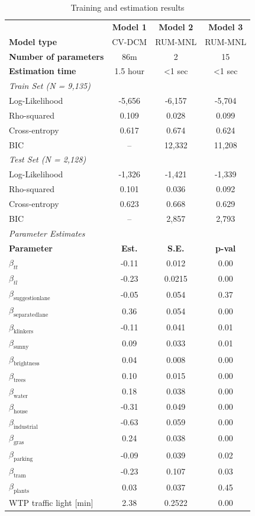 \begin{table}[htbp]
    \centering
    \caption{Training and estimation results}
    \begin{tabular}{lccc}
    \hline
     & \textbf{Model 1} & \textbf{Model 2} & \textbf{Model 3} \\
    \textbf{Model type} & CV-DCM & RUM-MNL & RUM-MNL \\
    \textbf{Number of parameters} & 86m & 2 & 15 \\
    \textbf{Estimation time} & 1.5 hour & <1 sec & <1 sec \\
    \hline
    \multicolumn{4}{l}{\textit{Train Set (N = 9,135)}} \\
    Log-Likelihood & -5,656 & -6,157 & -5,704 \\
    Rho-squared & 0.109 & 0.028 & 0.099 \\
    Cross-entropy & 0.617 & 0.674 & 0.624 \\
    BIC & -- & 12,332 & 11,208 \\
    \hline
    \multicolumn{4}{l}{\textit{Test Set (N = 2,128)}} \\
    Log-Likelihood & -1,326 & -1,421 & -1,339 \\
    Rho-squared & 0.101 & 0.036 & 0.092 \\
    Cross-entropy & 0.623 & 0.668 & 0.629 \\
    BIC & -- & 2,857 & 2,793 \\
    \hline
    \multicolumn{4}{l}{\textit{Parameter Estimates}} \\
    \textbf{Parameter} & \textbf{Est.} & \textbf{S.E.} & \textbf{p-val} \\
    $\beta_{tt}$ & -0.11 & 0.012 & 0.00 \\
    $\beta_{tl}$ & -0.23 & 0.0215 & 0.00 \\
    $\beta_{\text{suggestionlane}}$ & -0.05 & 0.054 & 0.37 \\
    $\beta_{\text{separatedlane}}$ & 0.36 & 0.054 & 0.00 \\
    $\beta_{\text{klinkers}}$ & -0.11 & 0.041 & 0.01 \\
    $\beta_{\text{sunny}}$ & 0.09 & 0.033 & 0.01 \\
    $\beta_{\text{brightness}}$ & 0.04 & 0.008 & 0.00 \\
    $\beta_{\text{trees}}$ & 0.10 & 0.015 & 0.00 \\
    $\beta_{\text{water}}$ & 0.18 & 0.038 & 0.00 \\
    $\beta_{\text{house}}$ & -0.31 & 0.049 & 0.00 \\
    $\beta_{\text{industrial}}$ & -0.63 & 0.059 & 0.00 \\
    $\beta_{\text{gras}}$ & 0.24 & 0.038 & 0.00 \\
    $\beta_{\text{parking}}$ & -0.09 & 0.039 & 0.02 \\
    $\beta_{\text{tram}}$ & -0.23 & 0.107 & 0.03 \\
    $\beta_{\text{plants}}$ & 0.03 & 0.037 & 0.45 \\
    WTP traffic light [min] & 2.38 & 0.2522 & 0.00 \\
    \hline
    \end{tabular}
    \end{table}
